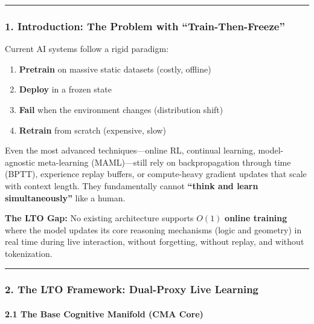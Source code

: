 \documentclass[
  11pt,
  a4paper,
]{article}
\providecommand{\tightlist}{%
  \setlength{\itemsep}{0pt}\setlength{\parskip}{0pt}}
\begin{document}
\begin{center}\rule{0.5\linewidth}{0.5pt}\end{center}

\subsubsection{1. Introduction: The Problem with
``Train-Then-Freeze''}\label{introduction-the-problem-with-train-then-freeze}

Current AI systems follow a rigid paradigm:

\begin{enumerate}
\def\labelenumi{\arabic{enumi}.}
\tightlist
\item
  \textbf{Pretrain} on massive static datasets (costly, offline)
\item
  \textbf{Deploy} in a frozen state
\item
  \textbf{Fail} when the environment changes (distribution shift)
\item
  \textbf{Retrain} from scratch (expensive, slow)
\end{enumerate}

Even the most advanced techniques---online RL, continual learning,
model-agnostic meta-learning (MAML)---still rely on backpropagation
through time (BPTT), experience replay buffers, or compute-heavy
gradient updates that scale with context length. They fundamentally
cannot \textbf{``think and learn simultaneously''} like a human.

\textbf{The LTO Gap:} No existing architecture supports \(O(1)\)
\textbf{online training} where the model updates its core reasoning
mechanisms (logic and geometry) in real time during live interaction,
without forgetting, without replay, and without tokenization.

\begin{center}\rule{0.5\linewidth}{0.5pt}\end{center}

\subsubsection{2. The LTO Framework: Dual-Proxy Live
Learning}\label{the-lto-framework-dual-proxy-live-learning}

\paragraph{2.1 The Base Cognitive Manifold (CMA
Core)}\label{the-base-cognitive-manifold-cma-core}
\end{document}
